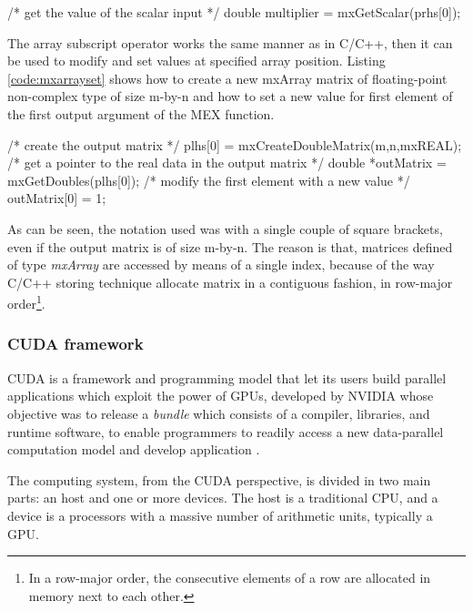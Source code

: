\documentclass[12pt,a4paper]{extarticle}
\begin{document}
\begin{cpp}[caption={Accessing the first non-imaginary element of the mxArray pointer passed as argument from the MEX function input arguments},label=code:mxarraygetscalar]
/* get the value of the scalar input  */
double multiplier = mxGetScalar(prhs[0]);
\end{cpp}

The array subscript operator works the same manner as in C/C++, then it can be used to modify and set values at specified array position. Listing \ref{code:mxarrayset} shows how to create a new mxArray matrix of floating-point non-complex type of size m-by-n and how to set a new value for first element of the first output argument of the MEX function.

\begin{cpp}[caption={Create the output matrix corresponding to the first output array. Get the pointer to the real data and set a new value for the first element},label=code:mxarrayset]
/* create the output matrix */
plhs[0] = mxCreateDoubleMatrix(m,n,mxREAL);
/* get a pointer to the real data in the output matrix */
double *outMatrix = mxGetDoubles(plhs[0]);
/* modify the first element with a new value */
outMatrix[0] = 1;
\end{cpp}

As can be seen, the notation used was with a single couple of square brackets, even if the output matrix is of size m-by-n. The reason is that, matrices defined of type \textit{mxArray} are accessed by means of a single index, because of the way C/C++ storing technique allocate matrix in a contiguous fashion, in row-major order\footnote{In a row-major order, the consecutive elements of a row are allocated in memory next to each other. %
}.


\subsubsection{CUDA framework}
CUDA is a framework and programming model that let its users build parallel applications which exploit the power of GPUs, developed by NVIDIA whose objective was to release a \textit{bundle} which consists of a compiler, libraries, and runtime software, to enable programmers to readily access a new data-parallel computation model and develop application  \cite{KirkHwu_2014:3}.

The computing system, from the CUDA perspective, is divided in two main parts: an host and one or more devices. The host is a traditional CPU, and a device is a processors with a massive number of arithmetic units, typically a GPU.
\end{document}
